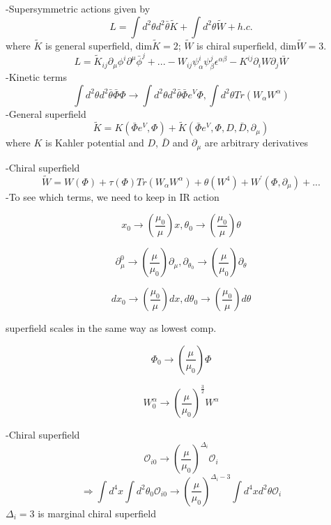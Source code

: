 \documentclass[type = bachelor]{fduthesis-en}
\begin{document}
\bigskip
-Supersymmetric actions given by 
\begin{equation}
L = \int d^2\theta d^2\bar{\theta}\widetilde{K}+\int d^2\theta \widetilde{W}+h.c.
\end{equation}
where $\widetilde{K}$ is general superfield, dim$\widetilde{K}=2$; $\widetilde{W}$ is chiral superfield, dim$\widetilde{W}=3$.
\begin{equation}
L = \widetilde{K}_{ij}\partial_{\mu}\phi^{i}\partial^{\mu}\bar{\phi}^j+...-W_{ij}\psi^i_{\alpha}\psi^j_{\beta}\epsilon^{\alpha\beta}-K^{ij}\partial_iW\partial_j\bar{W}
\end{equation}
-Kinetic terms
\begin{equation}
\int d^2\theta d^2\bar{\theta} \bar{\Phi}\Phi \longrightarrow \int d^2\theta d^2\bar{\theta} \bar{\Phi}e^V\Phi, \int d^2\theta Tr(W_{\alpha}W^{\alpha})
\end{equation}
-General superfield
\begin{equation}
\widetilde{K}=K(\bar{\Phi}e^V, \Phi)+\widetilde{K}(\bar{\Phi}e^V, \Phi, D, \bar{D}, \partial_{\mu})
\end{equation}
where $K$ is Kahler potential and $D$, $\bar{D}$ and $\partial_{\mu}$ are arbitrary derivatives

\noindent-Chiral superfield
\begin{equation}
\widetilde{W}=W(\Phi)+\tau(\Phi)Tr(W_{\alpha}W^{\alpha})+\theta(W^4)+W^{\prime}(\Phi, \partial_{\mu})+...
\end{equation}
-To see which terms, we need to keep in IR action

$$x_0\rightarrow(\frac{\mu_0}{\mu})x, \theta_0\rightarrow(\frac{\mu_0}{\mu})\theta$$

$$\partial^0_{\mu}\rightarrow(\frac{\mu}{\mu_0})\partial_{\mu}, \partial_{\theta_0}\rightarrow(\frac{\mu}{\mu_0})\partial_{\theta}$$

$$dx_0\rightarrow(\frac{\mu_0}{\mu})dx, d\theta_0\rightarrow(\frac{\mu_0}{\mu})d\theta$$

superfield scales in the same way as lowest comp.

$$\Phi_0\rightarrow(\frac{\mu}{\mu_0})\Phi$$

$$W^{\alpha}_0\rightarrow(\frac{\mu}{\mu_0})^{\frac{3}{2}}W^{\alpha}$$

\noindent-Chiral superfield 
$$\mathcal{O}_{i0}\rightarrow(\frac{\mu}{\mu_0})^{\Delta_i}\mathcal{O}_i$$
$$\Rightarrow \int d^4x\int d^2\theta_0\mathcal{O}_{i0}\rightarrow(\frac{\mu}{\mu_0})^{\Delta_i-3}\int d^4x d^2\theta \mathcal{O}_i$$
$\Delta_i=3$ is marginal chiral superfield
\end{document}

